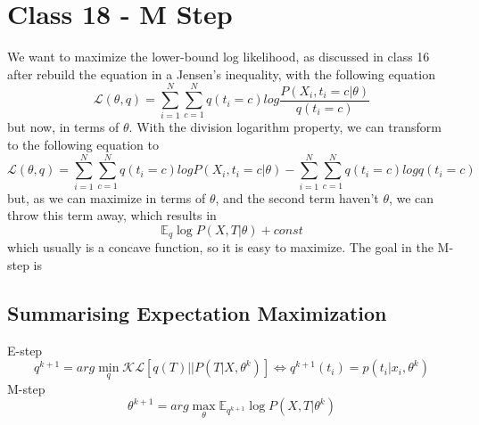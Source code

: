 \documentclass{article}
\begin{document}
\section{Class 18 - M Step}
We want to maximize the lower-bound log likelihood, as discussed in class 16 after rebuild the equation in a Jensen's inequality, with the following equation
\begin{equation}
    \mathcal{L}(\theta, q) = \sum_{i=1}^N \sum_{c=1}^N q(t_i = c) log \frac{P(X_i, t_i = c|\theta)}{q(t_i = c)}
\end{equation}
but now, in terms of $\theta$. With the division logarithm property, we can transform to the following equation to
\begin{equation}
    \mathcal{L}(\theta, q) = \sum_{i=1}^N \sum_{c=1}^N q(t_i = c) log P(X_i, t_i = c|\theta) - \sum_{i=1}^N \sum_{c=1}^N q(t_i = c) log q(t_i = c)
\end{equation}
but, as we can maximize in terms of $\theta$, and the second term haven't $\theta$, we can throw this term away, which results in
\begin{equation}
    \mathbb{E}_q \log P(X, T|\theta) + const
\end{equation}
which usually is a concave function, so it is easy to maximize. The goal in the M-step is

\subsection{Summarising Expectation Maximization}
E-step
\begin{equation}
    q^{k+1} = arg \min_q \mathcal{KL}[q(T) || P(T|X, \theta^k)] \Leftrightarrow q^{k+1}(t_i) = p(t_i|x_i, \theta^k)
\end{equation}
M-step
\begin{equation}
    \theta^{k+1} = arg \max_\theta \mathbb{E}_{q^{k+1}} \log P(X, T|\theta^k)
\end{equation}
\end{document}

